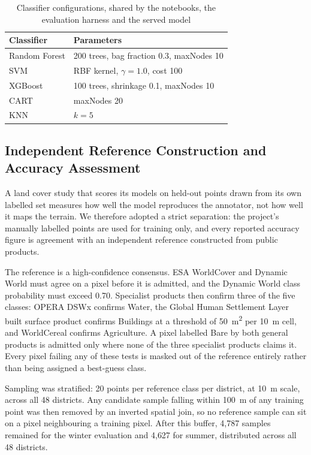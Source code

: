 \documentclass[conference]{IEEEtran}
\begin{document}
\begin{table}[!t]
\caption{Classifier configurations, shared by the notebooks, the
evaluation harness and the served model}
\label{tab:models}
\centering
\footnotesize
\begin{tabular}{@{}ll@{}}
\toprule
\textbf{Classifier} & \textbf{Parameters} \\
\midrule
Random Forest & 200 trees, bag fraction 0.3, maxNodes 10 \\
SVM & RBF kernel, $\gamma=1.0$, cost 100 \\
XGBoost & 100 trees, shrinkage 0.1, maxNodes 10 \\
CART & maxNodes 20 \\
KNN & $k=5$ \\
\bottomrule
\end{tabular}
\end{table}

\subsection{Independent Reference Construction and Accuracy Assessment}
\label{sec:reference}

A land cover study that scores its models on held-out points drawn from
its own labelled set measures how well the model reproduces the
annotator, not how well it maps the terrain. We therefore adopted a
strict separation: the project's manually labelled points are used for
training only, and every reported accuracy figure is agreement with an
independent reference constructed from public products.

The reference is a high-confidence consensus. ESA WorldCover
\cite{ref18} and Dynamic World \cite{ref19} must agree on a pixel before
it is admitted, and the Dynamic World class probability must exceed 0.70.
Specialist products then confirm three of the five classes: OPERA DSWx
confirms Water, the Global Human Settlement Layer built surface product
confirms Buildings at a threshold of 50~m\textsuperscript{2} per 10~m
cell, and WorldCereal \cite{ref29} confirms Agriculture. A pixel labelled
Bare by both general products is admitted only where none of the three
specialist products claims it. Every pixel failing any of these tests is
masked out of the reference entirely rather than being assigned a
best-guess class.

Sampling was stratified: 20 points per reference class per district, at
10~m scale, across all 48 districts. Any candidate sample falling within
100~m of any training point was then removed by an inverted spatial
join, so no reference sample can sit on a pixel neighbouring a training
pixel. After this buffer, 4{,}787 samples remained for the winter
evaluation and 4{,}627 for summer, distributed across all 48 districts.
\end{document}
